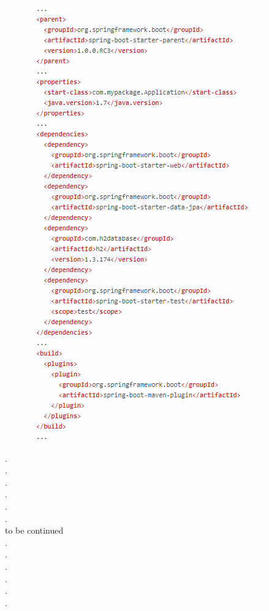 \documentclass[12pt, letterpaper]{article}
\begin{document}
	\begin{figure}[H]
		\centering
		\includegraphics{POM_example.png}
	\end{figure}

.\\
.\\
.\\
.\\
.\\
.\\
to be continued\\
.\\
.\\
.\\
.\\
.\\
.\\

\cleardoublepage


\end{document}
